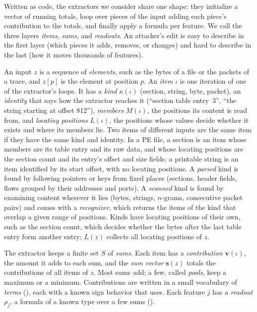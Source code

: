 Written as code, the extractors we consider share one shape: they initialize a vector of running totals, loop over
pieces of the input adding each piece's contribution to the totals, and finally apply a formula per feature. We call
the three layers \emph{items}, \emph{sums}, and \emph{readouts}. An attacker's edit is easy to describe in the first layer
(which pieces it adds, removes, or changes) and hard to describe in the last (how it moves thousands of features).

An input $z$ is a sequence of \emph{elements}, such as the bytes of a file or the packets of a trace, and $z[p]$ is
the element at position $p$. An \emph{item} $\iota$ is one iteration of one of the extractor's loops. It has a
\emph{kind} $\kappa(\iota)$ (section, string, byte, packet), an \emph{identity} that says how the extractor reaches it
(``section table entry~3'', ``the string starting at offset 812''), \emph{members} $M(\iota)$, the positions its
content is read from, and \emph{locating positions} $L(\iota)$, the positions whose values decide whether it exists
and where its members lie. Two items of different inputs are the same item if they have the same kind and identity.
In a PE file, a section is an item whose members are its table entry and its raw data, and whose locating positions
are the section count and its entry's offset and size fields; a printable string is an item identified by its start
offset, with no locating positions. A \emph{parsed} kind is found by following pointers or keys from fixed places
(sections, header fields, flows grouped by their addresses and ports). A \emph{scanned} kind is found by examining
content wherever it lies (bytes, strings, $n$-grams, consecutive packet pairs) and comes with a \emph{recognizer},
which returns the items of the kind that overlap a given range of positions. Kinds have locating positions of their
own, such as the section count, which decides whether the bytes after the last table entry form another entry;
$L(z)$ collects all locating positions of $z$.

The extractor keeps a finite set $S$ of \emph{sums}. Each item has a \emph{contribution} $\mathbf{v}(\iota)$, the
amount it adds to each sum, and the \emph{sum vector} $\mathbf{s}(z)$ totals the contributions of all items of $z$.
Most sums add; a few, called \emph{pools}, keep a maximum or a minimum. Contributions are written in a small
vocabulary of \emph{terms} (), each with a known sign behavior that
 uses. Each feature $j$ has a \emph{readout} $\rho_j$, a formula of a known type over a few
sums ().

